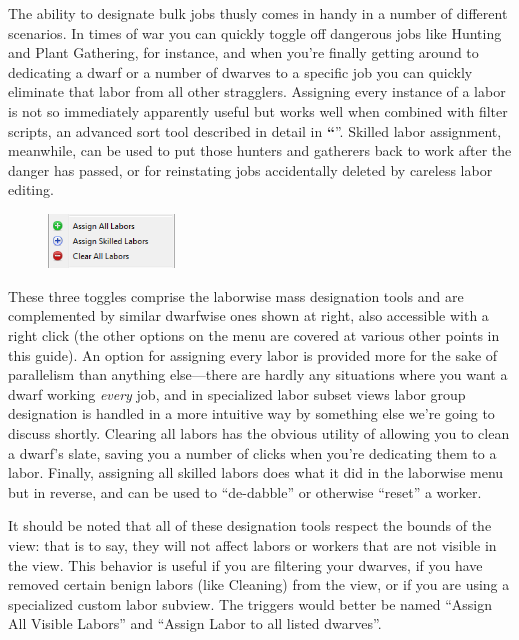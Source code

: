 \documentclass[]{article}
\newcommand{\jump}[1] {\textbf{``\nameref{sec:#1}}''}
\begin{document}
The ability to designate bulk jobs thusly comes in handy in a number of different scenarios. In times of
war you can quickly toggle off dangerous jobs like Hunting and Plant Gathering, for instance, and when
you're finally getting around to dedicating a dwarf or a number of dwarves to a specific job you can
quickly eliminate that labor from all other stragglers. Assigning every instance of a labor is not so
immediately apparently useful but works well when combined with filter scripts, an advanced sort tool
described in detail in \jump{Filter Scripts}. Skilled labor assignment, meanwhile, can
be used to put those hunters and gatherers back to work after the danger has passed, or for reinstating
jobs accidentally deleted by careless labor editing.

\begin{figure}
\vspace{-20pt}
  \begin{center}
    \includegraphics[width=0.3\textwidth]{Sec2Fig5-2}
  \end{center}
\vspace{-10pt}
\end{figure}
These three toggles comprise the laborwise mass designation tools and are complemented by similar
dwarfwise ones shown at right, also accessible with a right click (the other options on the menu are
covered at various other points in this guide). An option for assigning every labor is provided more for
the sake of parallelism than anything else---there are hardly any situations where you want a dwarf
working \emph{every} job, and in specialized labor subset views labor group designation is handled in a
more intuitive way by something else we're going to discuss shortly. Clearing all labors has the obvious
utility of allowing you to clean a dwarf's slate, saving you a number of clicks when you're dedicating
them to a labor. Finally, assigning all skilled labors does what it did in the laborwise menu but in
reverse, and can be used to ``de-dabble'' or otherwise ``reset'' a worker.

It should be noted that all of these designation tools respect the bounds of the view: that is to say,
they will not affect labors or workers that are not visible in the view. This behavior is useful if you
are filtering your dwarves, if you have removed certain benign labors (like Cleaning) from the view, or
if you are using a specialized custom labor subview. The triggers would better be named ``Assign All
Visible Labors'' and ``Assign Labor to all listed dwarves''.
\end{document}
